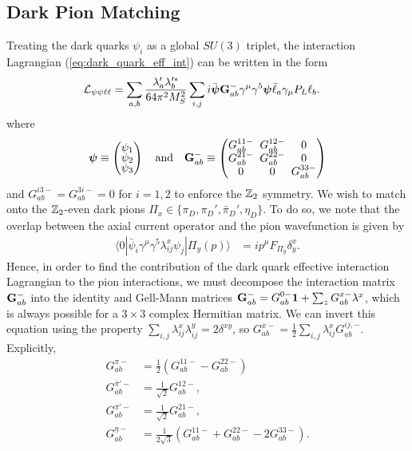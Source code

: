 \subsection{Dark Pion Matching}
Treating the dark quarks $\psi_i$ as a global $SU(3)$ triplet, the interaction Lagrangian (\ref{eq:dark_quark_eff_int}) can be written in the form 
\begin{align}
    {\cal L}_{\psi\psi\ell\ell} &= \sum_{a,b}\frac{\lambda_a'\lambda_b'^*}{64\pi^2 M_S^2} \sum_{i,j}{
    i\bar{\boldsymbol \psi}{\bf G}_{ab}^{-}\gamma^\mu \gamma^5{\boldsymbol{\psi}} }\bar{\ell}_a \gamma_\mu P_L \ell_b.
\end{align}
where
\begin{align}
   \setlength{\arraycolsep}{0.1cm}\renewcommand{\arraystretch}{0.6}  {\boldsymbol \psi} \equiv \begin{pmatrix}\psi_1 \\ \psi_2 \\ \psi_3 \end{pmatrix}\ \ \ {\rm and} \ \ \ {\bf G}_{ab}^{-} \equiv \begin{pmatrix}G^{11-}_{ab} & G^{12-}_{ab} & 0 \\ G^{21-}_{ab} & G^{22-}_{ab} & 0 \\ 0 & 0 & G^{33-}_{ab}\end{pmatrix}
\end{align}
and $G_{ab}^{i3-} = G_{ab}^{3i-} = 0$ for $i = 1, 2$ to enforce the ${\Bbb Z}_2$ symmetry. We wish to match onto the ${\Bbb Z}_2$-even dark pions $\Pi_x \in \{\pi_D, \pi_D', \bar{\pi}_D', \eta_D\}$. To do so, we note that the overlap between the axial current operator and the pion wavefunction is given by
\begin{align}
    \langle 0|\bar{\psi}_i \gamma^\mu\gamma^5 \lambda^x_{ij}\psi_j|\Pi_y(p)\rangle &= ip^\mu F_{\Pi_y}\delta^{x}_{y}.
\end{align}
Hence, in order to find the contribution of the dark quark effective interaction Lagrangian to the pion interactions, we must decompose the interaction matrix ${\bf G}_{ab}^-$ into the identity and Gell-Mann matrices ${\bf G}_{ab}^- = G_{ab}^{0-}{\bf 1} + \sum_{z}G_{ab}^{x-}\lambda^{x}$, which is always possible for a $3\times 3$ complex Hermitian matrix. We can invert this equation using the property $\sum_{i,j} \lambda_{ij}^x\lambda_{ij}^y = 2\delta^{xy}$, so $G_{ab}^{x-} = \frac{1}{2}\sum_{i,j}\lambda_{ij}^x G_{ab}^{ij,-}$. Explicitly,
\begin{align}
    G_{ab}^{\pi-} &= \frac{1}{2}(G_{ab}^{11-} -G_{ab}^{22-} )\\
    G_{ab}^{\bar{\pi}'-} &= \frac{1}{\sqrt{2}}G_{ab}^{12-},\\
    G_{ab}^{\pi'-} &= \frac{1}{\sqrt{2}}G_{ab}^{21-},\\
    G_{ab}^{\eta -} &= \frac{1}{2\sqrt{3}}(G_{ab}^{11-} + G_{ab}^{22-} - 2 G_{ab}^{33-}).
\end{align}
